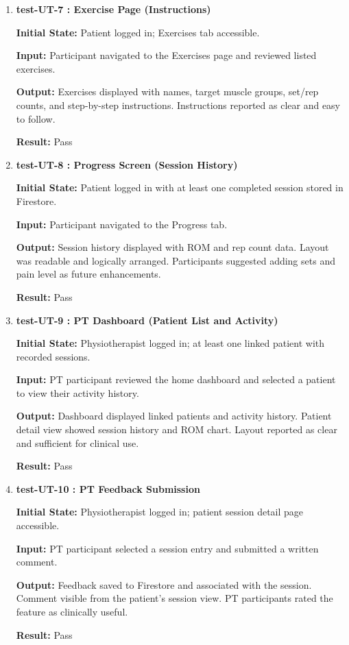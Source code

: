 \documentclass[12pt, titlepage]{article}
\begin{document}
\begin{enumerate}
\item \textbf{test-UT-7 : Exercise Page (Instructions)}

\textbf{Initial State:} Patient logged in; Exercises tab accessible.

\textbf{Input:} Participant navigated to the Exercises page and reviewed listed exercises.

\textbf{Output:} Exercises displayed with names, target muscle groups, set/rep counts, and step-by-step instructions. Instructions reported as clear and easy to follow.

\textbf{Result:} Pass

\vspace{0.5em}

\item \textbf{test-UT-8 : Progress Screen (Session History)}

\textbf{Initial State:} Patient logged in with at least one completed session stored in Firestore.

\textbf{Input:} Participant navigated to the Progress tab.

\textbf{Output:} Session history displayed with ROM and rep count data. Layout was readable and logically arranged. Participants suggested adding sets and pain level as future enhancements.

\textbf{Result:} Pass

\vspace{0.5em}

\item \textbf{test-UT-9 : PT Dashboard (Patient List and Activity)}

\textbf{Initial State:} Physiotherapist logged in; at least one linked patient with recorded sessions.

\textbf{Input:} PT participant reviewed the home dashboard and selected a patient to view their activity history.

\textbf{Output:} Dashboard displayed linked patients and activity history. Patient detail view showed session history and ROM chart. Layout reported as clear and sufficient for clinical use.

\textbf{Result:} Pass

\vspace{0.5em}

\item \textbf{test-UT-10 : PT Feedback Submission}

\textbf{Initial State:} Physiotherapist logged in; patient session detail page accessible.

\textbf{Input:} PT participant selected a session entry and submitted a written comment.

\textbf{Output:} Feedback saved to Firestore and associated with the session. Comment visible from the patient's session view. PT participants rated the feature as clinically useful.

\textbf{Result:} Pass


\end{enumerate}
		
\end{document}
